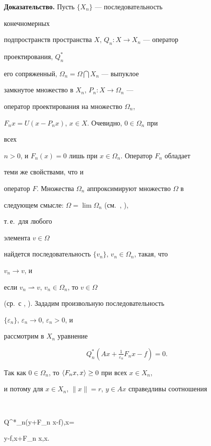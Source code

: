  


{\bf Доказательство.} Пусть $\{X_n\}$ --- последовательность 


конечномерных 


подпространств пространства $X$, $Q_n:X\to X_n$ --- оператор 


проектирования, $Q^*_n$ 


его сопряженный, $\Omega_n=\Omega\bigcap X_n$ --- выпуклое 


замкнутое множество в $X_n$, $P_n:X\to\Omega_n$ --- 


оператор проектирования на множество $\Omega_n$, 


$F_n x=U(x-P_n x)$, $x\in X$. Очевидно, $0\in \Omega_n$ при 


всех 


$n>0$, и $F_n(x)=0$ лишь при $x\in \Omega_n$. Оператор $F_n$ обладает 


теми же свойствами, что и 


оператор $F$. Множества $\Omega_n$ аппроксимируют множество $\Omega$ в 


следующем смысле: $\Omega=\lim\Omega_n$ (см.~\cite{9}, \cite{4}), 


т.\,е.~для любого 


элемента $v\in\Omega$ 


найдется последовательность $\{v_n\}$, $v_n\in\Omega_n$, такая, что 


$v_n\to v$, и 


если $v_n\rightharpoonup v$, $v_n\in\Omega_n$, то $v\in\Omega$ 


(ср.~с \cite{10}, \cite{11}). Зададим произвольную последовательность 


$\{\varepsilon_n\}$, $\varepsilon_n\to 0$, $\varepsilon_n>0$, и 


рассмотрим в $X_n$ уравнение 


\begin{equation} 


Q^*_n(Ax+\tfrac{1}{\varepsilon_n}F_n x-f)=0. 


\end{equation} 


Так как $0\in\Omega_n$, то $\langle F_n x,x\rangle\ge 0$ при всех $x\in X_n$, 


и потому для $x\in X_n$, $\|x\|=r$, $y\in Ax$ справедливы соотношения 


$$ 


\la Q^*_n(y+F_n x-f),x\ra= 


\la y-f,x\ra+\la F_n x,x\ra{}. 


